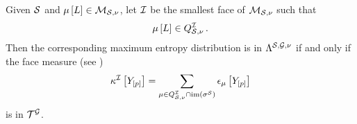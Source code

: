 \begin{theorem}
    \label{the:tnRepresentationMaxEntropy}
    Given $\mathcal{S}$ and $\mu\left[L\right]\in\mathcal{M}_{\mathcal{S},\nu}$, let $\mathcal{I}$ be the smallest face of $\mathcal{M}_{\mathcal{S},\nu}$ such that
    \begin{align*}
        \mu\left[L\right] \in Q^{\mathcal{I}}_{\mathcal{S},\nu} \, .
    \end{align*}
    Then the corresponding maximum entropy distribution is in $\Lambda^{\mathcal{S},\mathcal{G},\nu}$ if and only if the face measure (see )
    \begin{align*}
        \kappa^{\mathcal{I}}\left[Y_{[p]}\right]
        = \sum_{\mu\in Q^{\mathcal{I}}_{\mathcal{S},\nu}\cap\mathrm{im}\left(\sigma^{\mathcal{S}}\right)} \epsilon_{\mu}\left[Y_{[p]}\right]
    \end{align*}
    is in $\mathcal{T}^{\mathcal{G}}$.
\end{theorem}
